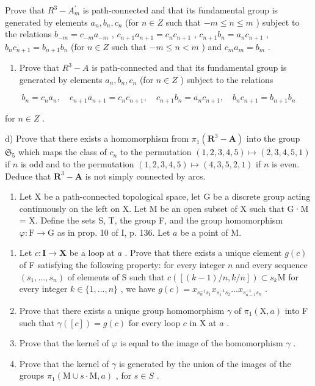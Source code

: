Prove that \(R^{3}-A_{m}^{\prime}\) is path-connected and that its fundamental group is generated by elements \(a_{n}, b_{n}, c_{n}\) (for \(n \in Z\) such that \(-m \leqslant n \leqslant m\) ) subject to the relations \(b_{-m} = c_{-m}a_{-m}\) , \(c_{n+1}a_{n+1} = c_{n}c_{n+1}\) , \(c_{n+1}b_{n} = a_{n}c_{n+1}\) , \(b_{n}c_{n+1} = b_{n+1}b_{n}\) (for \(n \in Z\) such that \(-m \leqslant n < m\) ) and \(c_{m}a_{m} = b_{m}\) .

\begin{enumerate}
\def\labelenumi{\alph{enumi})}
\setcounter{enumi}{2}
\tightlist
\item
   Prove that \(R^{3}-A\) is path-connected and that its fundamental group is generated by elements \(a_{n}, b_{n}, c_{n}\) (for \(n \in Z\) ) subject to the relations
\end{enumerate}

\[
b _ {n} = c _ {n} a _ {n}, \quad c _ {n + 1} a _ {n + 1} = c _ {n} c _ {n + 1}, \quad c _ {n + 1} b _ {n} = a _ {n} c _ {n + 1}, \quad b _ {n} c _ {n + 1} = b _ {n + 1} b _ {n}
\]

 for \(n \in Z\) .

d) Prove that there exists a homomorphism from \(\pi_1(\mathbf{R}^3 -\mathbf{A})\) into the group \(\mathfrak{S}_5\) which maps the class of \(c_{n}\) to the permutation \((1,2,3,4,5)\mapsto (2,3,4,5,1)\) if \(n\) is odd and to the permutation \((1,2,3,4,5)\mapsto (4,3,5,2,1)\) if \(n\) is even. Deduce that \(\mathbf{R}^3 -\mathbf{A}\) is not simply connected by arcs.

\begin{enumerate}
\def\labelenumi{\arabic{enumi})}
\setcounter{enumi}{33}
\tightlist
\item
  Let X be a path-connected topological space, let G be a discrete group acting continuously on the left on X. Let M be an open subset of X such that G·M = X. Define the sets S, T, the group F, and the group homomorphism \(\varphi\colon\mathrm{F}\to\mathrm{G}\) as in prop. 10 of I, p. 136. Let \(a\) be a point of M.
\end{enumerate}

\begin{enumerate}
\def\labelenumi{\alph{enumi})}
\item
  Let \(c\colon\mathbf{I}\to\mathbf{X}\) be a loop at \(a\) . Prove that there exists a unique element \(g(c)\) of F satisfying the following property: for every integer \(n\) and every sequence \((s_{1},\ldots,s_{n})\) of elements of S such that \(c([(k-1)/n,k/n])\subset s_{k}\mathrm{M}\) for every integer \(k\in\{1,\ldots,n\}\) , we have \(g(c)=x_{s_{n}^{-1}s_{1}}x_{s_{1}^{-1}s_{2}}\ldots x_{s_{n-1}^{-1}s_{n}}\) .
\item
  Prove that there exists a unique group homomorphism \(\gamma\) of \(\pi_1(\mathrm{X},a)\) into F such that \(\gamma ([c]) = g(c)\) for every loop \(c\) in X at \(a\) .
\item
  Prove that the kernel of \(\varphi\) is equal to the image of the homomorphism \(\gamma\) .
\item
  Prove that the kernel of \(\gamma\) is generated by the union of the images of the groups \(\pi_{1}(\mathrm{M}\cup s\cdot\mathrm{M},a)\) , for \(s\in S\) .
\end{enumerate}

